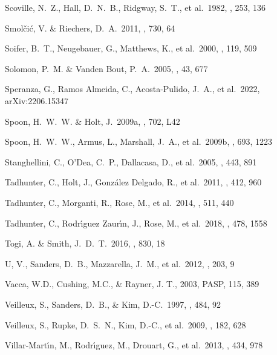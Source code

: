 \documentclass{aa}
\begin{document}
\begin{thebibliography}
 Scoville, N.~Z., Hall, D.~N.~B., Ridgway, S.~T., et al.\ 1982, \apj, 253, 136

 Smol{\v{c}}i{\'c}, V. \& Riechers, D.~A.\ 2011, \apj, 730, 64

 Soifer, B.~T., Neugebauer, G., Matthews, K., et al.\ 2000, \aj, 119, 509


 Solomon, P.~M. \& Vanden Bout, P.~A.\ 2005, \araa, 43, 677

 Speranza, G., Ramos Almeida, C., Acosta-Pulido, J.~A., et al.\ 2022, arXiv:2206.15347

 Spoon, H.~W.~W. \& Holt, J.\ 2009a, \apjl, 702, L42

 Spoon, H.~W.~W., Armus, L., Marshall, J.~A., et al.\ 2009b, \apj, 693, 1223

 Stanghellini, C., O'Dea, C.~P., Dallacasa, D., et al.\ 2005, \aap, 443, 891

 Tadhunter, C., Holt, J., Gonz{\'a}lez Delgado, R., et al.\ 2011, \mnras, 412, 960

 Tadhunter, C., Morganti, R., Rose, M., et al.\ 2014, \nat, 511, 440

 Tadhunter, C., Rodr{\'\i}guez Zaur{\'\i}n, J., Rose, M., et al.\ 2018, \mnras, 478, 1558

 Togi, A. \& Smith, J.~D.~T.\ 2016, \apj, 830, 18

 U, V., Sanders, D.~B., Mazzarella, J.~M., et al.\ 2012, \apjs, 203, 9

Vacca, W.D., Cushing, M.C.,  \&  Rayner, J. T.,  2003, PASP, 115, 389

 Veilleux, S., Sanders, D.~B., \& Kim, D.-C.\ 1997, \apj, 484, 92

 Veilleux, S., Rupke, D.~S.~N., Kim, D.-C., et al.\ 2009, \apjs, 182, 628

 Villar-Mart{\'\i}n, M., Rodr{\'\i}guez, M., Drouart, G., et al.\ 2013, \mnras, 434, 978


\end{thebibliography}
\end{document}
